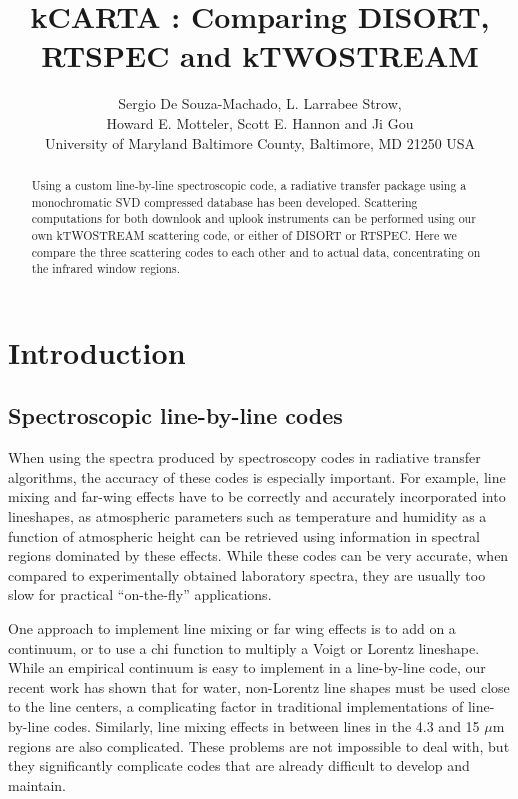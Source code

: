 \documentclass[11pt]{article}
\title{kCARTA : Comparing DISORT, RTSPEC and kTWOSTREAM}
\author{Sergio De Souza-Machado, L. Larrabee Strow,\\
       Howard E. Motteler, Scott E. Hannon and Ji Gou\\
       University of Maryland Baltimore County, Baltimore, MD 21250 USA}
\begin{document}
\maketitle

\begin{abstract}
  
  Using a custom line-by-line spectroscopic code, a radiative transfer package
  using a monochromatic \textsf{SVD} compressed database has been developed. 
  Scattering computations for both downlook and
  uplook instruments can be performed using our own \textsf{kTWOSTREAM} 
  scattering code, or either of \textsf{DISORT} or \textsf{RTSPEC}.
  Here we compare the three scattering codes to each other and to actual 
  data, concentrating on the infrared window regions.

\end{abstract}

\section{Introduction}

\subsection{Spectroscopic line-by-line codes}

When using the spectra produced by spectroscopy codes in radiative transfer
algorithms, the accuracy of these codes is especially important.
For example, line mixing and far-wing effects have to be correctly and
accurately incorporated into lineshapes, as atmospheric parameters 
such as temperature and humidity as a function of atmospheric height can be
retrieved using information in spectral regions dominated by these effects. 
While these codes can be very accurate, when compared to experimentally 
obtained laboratory spectra, they are usually too slow for practical 
``on-the-fly'' applications.

One approach to implement line mixing or far wing effects is to add on a 
continuum, or to use a chi function to  multiply a Voigt or Lorentz 
lineshape. While an empirical continuum is easy to implement in a 
line-by-line code, our recent
work has shown that for water, non-Lorentz line shapes must be used
close to the line centers, a complicating factor in traditional
implementations of line-by-line codes. Similarly, line mixing effects
in between \cd lines in the 4.3 and 15 $\mu$m regions are also complicated.
These problems are not impossible to deal with, but they significantly 
complicate codes that are already difficult to develop and maintain.
\end{document}
